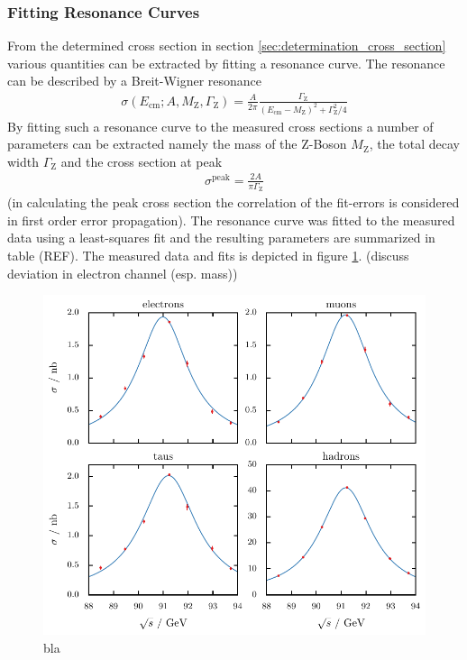 \documentclass[11pt, a4paper]{article}
\numberwithin{equation}{section}
\newcommand{\korr}[1]{{\color{red}(#1)}}
\begin{document}
\subsubsection{Fitting Resonance Curves}
\label{sec:fit_resonance}
From the determined cross section in section \ref{sec:determination_cross_section} various quantities can be extracted by fitting a resonance curve.
The resonance can be described by a Breit-Wigner resonance
\begin{align*}
	\sigma(E_\mathrm{cm}; A, M_\mathrm{Z}, \Gamma_\mathrm{Z}) = \frac{A}{2\pi} \frac{\Gamma_\mathrm{Z}}{(E_\mathrm{cm} - M_\mathrm{Z})^2 + \Gamma_\mathrm{Z}^2 / 4}
\end{align*}
By fitting such a resonance curve to the measured cross sections a number of parameters can be extracted namely the mass of the Z-Boson $M_\mathrm{Z}$, the total decay width $\Gamma_\mathrm{Z}$ and the cross section at peak
\begin{align*}
	\sigma^\mathrm{peak} = \frac{2A}{\pi \Gamma_\mathrm{Z}}
\end{align*}
(in calculating the peak cross section the correlation of the fit-errors is considered in first order error propagation).
The resonance curve was fitted to the measured data using a least-squares fit and the resulting parameters are summarized in table \korr{REF}.
The measured data and fits is depicted in figure \ref{fig:cross_section_fit}.
\korr{discuss deviation in electron channel (esp. mass)}


\begin{figure}[tb]
	\centering
	\includegraphics{./figures/cross_sections.pdf}
	\caption{bla}
	\label{fig:cross_section_fit}
\end{figure}
\end{document}
